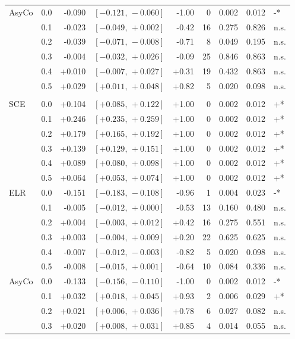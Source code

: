 \begin{small}
\begin{longtable}{llrrrrrrl}
AsyCo & 0.0 & -0.090 & $[-0.121,\,-0.060]$ & -1.00 & 0 & 0.002 & 0.012 & -* \\
 & 0.1 & -0.023 & $[-0.049,\,+0.002]$ & -0.42 & 16 & 0.275 & 0.826 & n.s. \\
 & 0.2 & -0.039 & $[-0.071,\,-0.008]$ & -0.71 & 8 & 0.049 & 0.195 & n.s. \\
 & 0.3 & -0.004 & $[-0.032,\,+0.026]$ & -0.09 & 25 & 0.846 & 0.863 & n.s. \\
 & 0.4 & +0.010 & $[-0.007,\,+0.027]$ & +0.31 & 19 & 0.432 & 0.863 & n.s. \\
 & 0.5 & +0.029 & $[+0.011,\,+0.048]$ & +0.82 & 5 & 0.020 & 0.098 & n.s. \\
\addlinespace
\multicolumn{9}{l}{\textit{Macro F1}} \\
SCE & 0.0 & +0.104 & $[+0.085,\,+0.122]$ & +1.00 & 0 & 0.002 & 0.012 & +* \\
 & 0.1 & +0.246 & $[+0.235,\,+0.259]$ & +1.00 & 0 & 0.002 & 0.012 & +* \\
 & 0.2 & +0.179 & $[+0.165,\,+0.192]$ & +1.00 & 0 & 0.002 & 0.012 & +* \\
 & 0.3 & +0.139 & $[+0.129,\,+0.151]$ & +1.00 & 0 & 0.002 & 0.012 & +* \\
 & 0.4 & +0.089 & $[+0.080,\,+0.098]$ & +1.00 & 0 & 0.002 & 0.012 & +* \\
 & 0.5 & +0.064 & $[+0.053,\,+0.074]$ & +1.00 & 0 & 0.002 & 0.012 & +* \\
ELR & 0.0 & -0.151 & $[-0.183,\,-0.108]$ & -0.96 & 1 & 0.004 & 0.023 & -* \\
 & 0.1 & -0.005 & $[-0.012,\,+0.000]$ & -0.53 & 13 & 0.160 & 0.480 & n.s. \\
 & 0.2 & +0.004 & $[-0.003,\,+0.012]$ & +0.42 & 16 & 0.275 & 0.551 & n.s. \\
 & 0.3 & +0.003 & $[-0.004,\,+0.009]$ & +0.20 & 22 & 0.625 & 0.625 & n.s. \\
 & 0.4 & -0.007 & $[-0.012,\,-0.003]$ & -0.82 & 5 & 0.020 & 0.098 & n.s. \\
 & 0.5 & -0.008 & $[-0.015,\,+0.001]$ & -0.64 & 10 & 0.084 & 0.336 & n.s. \\
AsyCo & 0.0 & -0.133 & $[-0.156,\,-0.110]$ & -1.00 & 0 & 0.002 & 0.012 & -* \\
 & 0.1 & +0.032 & $[+0.018,\,+0.045]$ & +0.93 & 2 & 0.006 & 0.029 & +* \\
 & 0.2 & +0.021 & $[+0.006,\,+0.036]$ & +0.78 & 6 & 0.027 & 0.082 & n.s. \\
 & 0.3 & +0.020 & $[+0.008,\,+0.031]$ & +0.85 & 4 & 0.014 & 0.055 & n.s. \\

\end{longtable}
\end{small}
